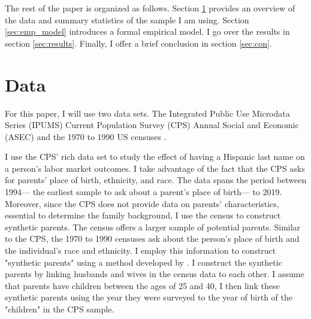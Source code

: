 \documentclass{wptemp}
\begin{document}
The rest of the paper is organized as follows. Section \ref{sec:data} provides an overview of the data and summary statistics of the sample I am using. Section \ref{sec:emp_model} introduces a formal empirical model. I go over the results in section \ref{sec:results}. Finally, I offer a brief conclusion in section \ref{sec:con}.

\section{Data}\label{sec:data}

For this paper, I will use two data sets. The Integrated Public Use Microdata Series (IPUMS) Current Population Survey (CPS) Annual Social and Economic (ASEC) \citep{cps2019} and the 1970 to 1990 US censuses \citep{acs2019}. 

I use the CPS' rich data set to study the effect of having a Hispanic last name on a person's labor market outcomes. I take advantage of the fact that the CPS asks for parents' place of birth, ethnicity, and race. The data spans the period between 1994--- the earliest sample to ask about a parent's place of birth--- to 2019. Moreover, since the CPS does not provide data on parents' characteristics, essential to determine the family background, I use the census to construct synthetic parents. The census offers a larger sample of potential parents. Similar to the CPS, the 1970 to 1990 censuses ask about the person's place of birth and the individual's race and ethnicity. I employ this information to construct "synthetic parents" using a method developed by \citet{rubinstein2014pride}. I construct the synthetic parents by linking husbands and wives in the census data to each other. I assume that parents have children between the ages of 25 and 40, I then link these synthetic parents using the year they were surveyed to the year of birth of the "children" in the CPS sample.
\end{document}
